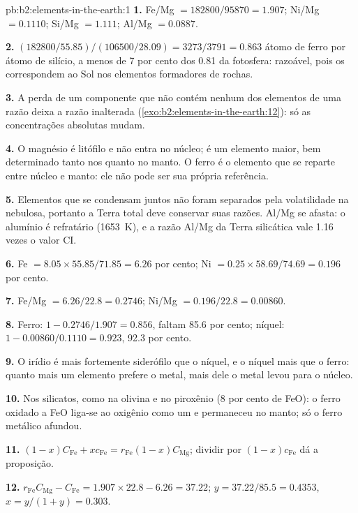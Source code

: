\begin{solution}{pb:b2:elements-in-the-earth:1}
\textbf{1.} Fe/Mg $= \num{182800}/\num{95870} = 1.907$; Ni/Mg $= 0.1110$; Si/Mg $=
1.111$; Al/Mg $= 0.0887$.

\textbf{2.} $(\num{182800}/55.85)/(\num{106500}/28.09) = 3273/3791 = 0.863$ átomo de ferro por
átomo de silício, a menos de 7 por cento dos 0.81 da fotosfera: razoável, pois os 
correspondem ao Sol nos elementos formadores de rochas.

\textbf{3.} A perda de um componente que não contém nenhum dos elementos de uma razão deixa a
razão inalterada (\cref{exo:b2:elements-in-the-earth:12}): só as concentrações absolutas mudam.

\textbf{4.} O magnésio é litófilo e não entra no núcleo; é um elemento maior,
bem determinado tanto nos  quanto no manto. O ferro é o elemento que se reparte
entre núcleo e manto: ele não pode ser sua própria referência.

\textbf{5.} Elementos que se condensam juntos não foram separados pela volatilidade na
nebulosa, portanto a Terra total deve conservar suas razões. Al/Mg se afasta: o alumínio é
refratário (\qty{1653}{K}), e a razão Al/Mg da Terra silicática vale 1.16 vezes o valor CI.

\textbf{6.} Fe $= 8.05\times55.85/71.85 = 6.26$ por cento; Ni $= 0.25\times58.69/74.69 =
0.196$ por cento.

\textbf{7.} Fe/Mg $= 6.26/22.8 = 0.2746$; Ni/Mg $= 0.196/22.8 = 0.00860$.

\textbf{8.} Ferro: $1 - 0.2746/1.907 = 0.856$, faltam 85.6 por cento; níquel:
$1 - 0.00860/0.1110 = 0.923$, 92.3 por cento.

\textbf{9.} O irídio é mais fortemente siderófilo que o níquel, e o níquel mais que o ferro:
quanto mais um elemento prefere o metal, mais dele o metal levou para o núcleo.

\textbf{10.} Nos silicatos, como  na olivina e no piroxênio (8 por cento de FeO):
o ferro oxidado a FeO liga-se ao oxigênio como um  e permaneceu no
manto; só o ferro metálico afundou.

\textbf{11.} $(1-x)C_{\mathrm{Fe}} + xc_{\mathrm{Fe}} = r_{\mathrm{Fe}}(1-x)C_{\mathrm{Mg}}$;
dividir por $(1-x)c_{\mathrm{Fe}}$ dá a proposição.

\textbf{12.} $r_{\mathrm{Fe}}C_{\mathrm{Mg}} - C_{\mathrm{Fe}} = 1.907\times22.8 - 6.26 =
37.22$; $y = 37.22/85.5 = 0.4353$, $x = y/(1+y) = 0.303$.


\end{solution}
